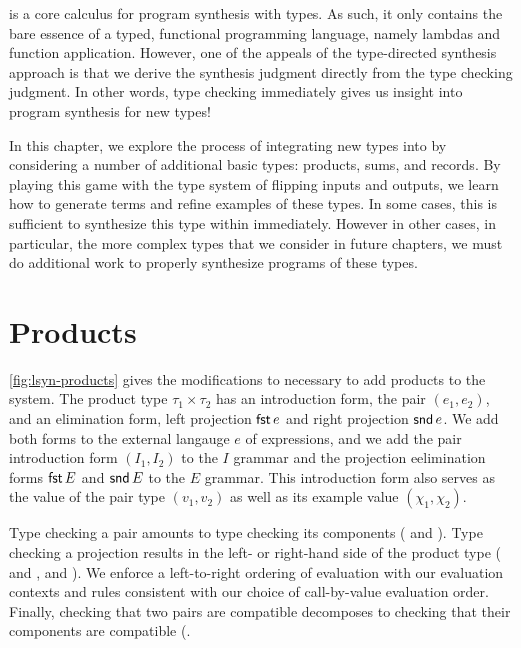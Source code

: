 \lsyn{} is a core calculus for program synthesis with types.
As such, it only contains the bare essence of a typed, functional programming language, namely lambdas and function application.
However, one of the appeals of the type-directed synthesis approach is that we derive the synthesis judgment directly from the type checking judgment.
In other words, type checking immediately gives us insight into program synthesis for new types!

In this chapter, we explore the process of integrating new types into \lsyn{} by considering a number of additional basic types: products, sums, and records.
By playing this game with the type system of flipping inputs and outputs, we learn how to generate terms and refine examples of these types.
In some cases, this is sufficient to synthesize this type within \lsyn{} immediately.
However in other cases, in particular, the more complex types that we consider in future chapters, we must do additional work to properly synthesize programs of these types.

\section{Products}



\autoref{fig:lsyn-products} gives the modifications to \lsyn{} necessary to add products to the system.
The product type $τ_1 × τ_2$ has an introduction form, the pair $(e_1, e_2)$, and an elimination form, left projection $\mathsf{fst}\,e$ and right projection $\mathsf{snd}\,e$.
We add both forms to the external langauge $e$ of expressions, and we add the pair introduction form $(I_1, I_2)$ to the $I$ grammar and the projection eelimination forms $\mathsf{fst}\,E$ and $\mathsf{snd}\,E$ to the $E$ grammar.
This introduction form also serves as the value of the pair type $(v_1, v_2)$ as well as its example value $(χ_1, χ_2)$.

Type checking a pair amounts to type checking its components ( and ).
Type checking a projection results in the left- or right-hand side of the product type ( and ,  and ).
We enforce a left-to-right ordering of evaluation with our evaluation contexts and rules consistent with our choice of call-by-value evaluation order.
Finally, checking that two pairs are compatible decomposes to checking that their components are compatible (.

